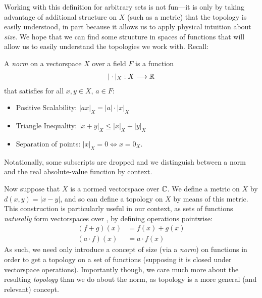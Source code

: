       Working with this definition for arbitrary sets is not fun---it is only by taking advantage of additional structure on $X$ (such as a metric) that the topology is easily understood, in part because it allows us to apply physical intuition about \emph{size}. 
      We hope that we can find some structure in spaces of functions that will allow us to easily understand the topologies we work with.
      Recall:
      \begin{defn}
        A \emph{norm} on a vectorspace $X$ over a field $F$ is a function
        \begin{align*}
          |\cdot|_X:X\longrightarrow\mathbb{R}
        \end{align*}
        that satisfies for all $x,y\in X$, $a\in F$:
        \begin{itemize}
          \item Positive Scalability: $|ax|_X=|a|\cdot|x|_X$
          \item Triangle Inequality: $|x+y|_X\le|x|_X+|y|_X$
          \item Separation of points: $|x|_X=0\Longleftrightarrow x=0_X$.
        \end{itemize}
        Notationally, some subscripts are dropped and we distinguish between a norm and the real absolute-value function by context.
      \end{defn}

      Now suppose that $X$ is a normed vectorspace over $\mathbb{C}$.
      We define a metric on $X$ by $d(x,y)=|x-y|$, and so can define a topology on $X$ by means of this metric.
      This construction is particularly useful in our context, as sets of functions \emph{naturally} form vectorspaces over \C, by defining operations pointwise:
      \begin{align*}
        (f+g)(x) &= f(x)+g(x)\\
        (a\cdot f)(x) &= a\cdot f(x)
      \end{align*}
      As such, we need only introduce a concept of size (via a \emph{norm}) on functions in order to get a topology on a set of functions (supposing it is closed under vectorspace operations).
      Importantly though, we care much more about the resulting \emph{topology} than we do about the norm, as topology is a more general (and relevant) concept.

